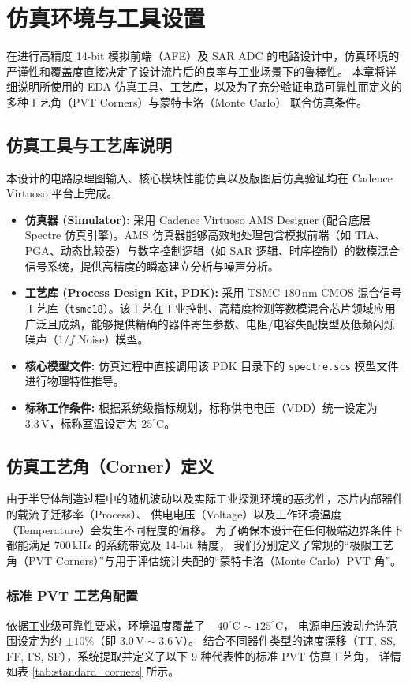 \chapter{仿真环境与工具设置}
在进行高精度 14-bit 模拟前端（AFE）及 SAR ADC 的电路设计中，仿真环境的严谨性和覆盖度直接决定了设计流片后的良率与工业场景下的鲁棒性。
本章将详细说明所使用的 EDA 仿真工具、工艺库，以及为了充分验证电路可靠性而定义的多种工艺角（PVT Corners）与蒙特卡洛（Monte Carlo）
联合仿真条件。

\section{仿真工具与工艺库说明}
本设计的电路原理图输入、核心模块性能仿真以及版图后仿真验证均在 Cadence Virtuoso 平台上完成。
\begin{itemize}
    \item \textbf{仿真器 (Simulator):} 采用 Cadence Virtuoso AMS Designer (配合底层 Spectre 仿真引擎)。AMS 仿真器能够高效地处理包含模拟前端（如 TIA、PGA、动态比较器）与数字控制逻辑（如 SAR 逻辑、时序控制）的数模混合信号系统，提供高精度的瞬态建立分析与噪声分析。
    \item \textbf{工艺库 (Process Design Kit, PDK):} 采用 TSMC $180\,\text{nm}$ CMOS 混合信号工艺库（\texttt{tsmc18}）。该工艺在工业控制、高精度检测等数模混合芯片领域应用广泛且成熟，能够提供精确的器件寄生参数、电阻/电容失配模型及低频闪烁噪声（$1/f$ Noise）模型。
    \item \textbf{核心模型文件:} 仿真过程中直接调用该 PDK 目录下的 \texttt{spectre.scs} 模型文件进行物理特性推导。
    \item \textbf{标称工作条件:} 根据系统级指标规划，标称供电电压（VDD）统一设定为 $3.3\,\text{V}$，标称室温设定为 $25^\circ\text{C}$。
\end{itemize}

\section{仿真工艺角（Corner）定义}
由于半导体制造过程中的随机波动以及实际工业探测环境的恶劣性，芯片内部器件的载流子迁移率（Process）、
供电电压（Voltage）以及工作环境温度（Temperature）会发生不同程度的偏移。
为了确保本设计在任何极端边界条件下都能满足 $700\,\text{kHz}$ 的系统带宽及 14-bit 精度，
我们分别定义了常规的“极限工艺角（PVT Corners）”与用于评估统计失配的“蒙特卡洛（Monte Carlo）PVT 角”。

\subsection{标准 PVT 工艺角配置}
依据工业级可靠性要求，环境温度覆盖了 $-40^\circ\text{C} \sim 125^\circ\text{C}$，
电源电压波动允许范围设定为约 $\pm 10\%$（即 $3.0\,\text{V} \sim 3.6\,\text{V}$）。
结合不同器件类型的速度漂移（TT, SS, FF, FS, SF），系统提取并定义了以下 9 种代表性的标准 PVT 仿真工艺角，
详情如表 \ref{tab:standard_corners} 所示。

